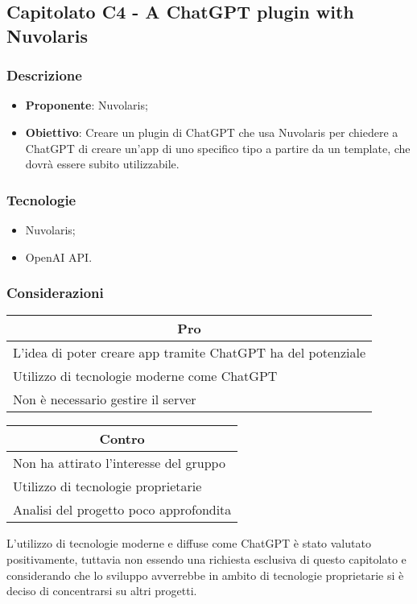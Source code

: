 \subsection{Capitolato C4 - A ChatGPT plugin with Nuvolaris}


\subsubsection{Descrizione}
\begin{itemize}
    \item \textbf{Proponente}: Nuvolaris;
    \item \textbf{Obiettivo}: Creare un plugin di ChatGPT che usa Nuvolaris per chiedere a ChatGPT di creare un'app di uno specifico tipo a partire da un template, che dovrà essere subito utilizzabile.
\end{itemize}


\subsubsection{Tecnologie}
\begin{itemize}
    \item Nuvolaris;
    \item OpenAI API.
\end{itemize}


\subsubsection{Considerazioni}
\begin{minipage}[t]{0.45\linewidth}
    \vspace{0pt}
    {\renewcommand{\arraystretch}{1.5}
    \begin{tabular}{p{1\linewidth}}
        \multicolumn{1}{c}{\textbf{Pro}} \\
        \midrule
        L'idea di poter creare app tramite ChatGPT ha del potenziale \\
        Utilizzo di tecnologie moderne come ChatGPT \\
        Non è necessario gestire il server \\
        \hline
    \end{tabular}
    }
\end{minipage}
\hspace{0.05\linewidth}
\begin{minipage}[t]{0.45\linewidth}
    \vspace{0pt}
    {\renewcommand{\arraystretch}{1.5}
    \begin{tabular}{p{1\linewidth}}
        \multicolumn{1}{c}{\textbf{Contro}} \\
        \midrule
        Non ha attirato l'interesse del gruppo \\
        Utilizzo di tecnologie proprietarie \\
        Analisi del progetto poco approfondita \\
        \hline
    \end{tabular}
    }
\end{minipage}
\vspace{1em}

L'utilizzo di tecnologie moderne e diffuse come ChatGPT è stato valutato positivamente, tuttavia non essendo una richiesta esclusiva di questo capitolato e considerando che lo sviluppo avverrebbe in ambito di tecnologie proprietarie si è deciso di concentrarsi su altri progetti.